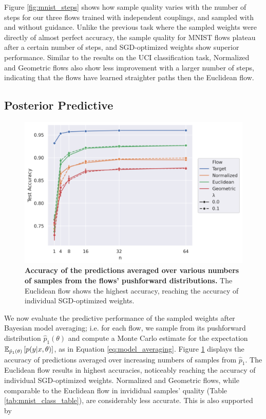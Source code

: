 Figure \ref{fig:mnist_steps} shows how sample quality varies with the number of steps for our three flows trained with independent couplings, and sampled with and without guidance. Unlike the previous task where the sampled weights were directly of almost perfect accuracy, the sample quality for MNIST flows plateau after a certain number of steps, and SGD-optimized weights show superior performance. Similar to the results on the UCI classification task, Normalized and Geometric flows also show less improvement with a larger number of steps, indicating that the flows have learned straighter paths then the Euclidean flow. 

\subsection{Posterior Predictive}

\begin{figure}[t!]
    \centering
    \includegraphics[width=0.7\linewidth]{figures/mnist/mnist_model_averaging.png}
    \caption{\label{fig:mnist_averaging}\textbf{Accuracy of the predictions averaged over various numbers of samples from the flows' pushforward distributions.} The Euclidean flow shows the highest accuracy, reaching the accuracy of individual SGD-optimized weights.} 
\end{figure}

We now evaluate the predictive performance of the sampled weights after Bayesian model averaging; i.e. for each flow, we sample from its pushforward distribution $\hat p_1 (\theta)$ and compute a Monte Carlo estimate for the expectation $\mathbb{E}_{\hat p_1 (\theta)} \left[ p(y\vert x, \theta) \right]$, as in Equation \ref{eq:model_averaging}. Figure \ref{fig:mnist_averaging} displays the accuracy of predictions averaged over increasing numbers of samples from $\hat p_1$. The Euclidean flow results in highest accuracies, noticeably reaching the accuracy of individual SGD-optimized weights. Normalized and Geometric flows, while comparable to the Euclidean flow in invididual samples' quality (Table \ref{tab:mnist_class_table}), are considerably less accurate. This is also supported by 

